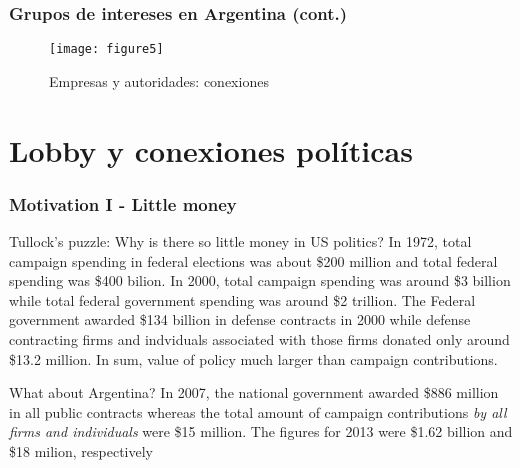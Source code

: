 \documentclass[handout,final,xcolor=dvipsnames]{beamer}
\begin{document}
\begin{frame}\frametitle{Grupos de intereses en Argentina (cont.)}
\begin{figure}[htbp] \vspace{-0.25cm}
  \centering
  \texttt{[image: figure5]} \vspace{0cm}
  \caption{Empresas y autoridades: conexiones}
  \label{fig:3}
\end{figure}
\end{frame}


\section{Lobby y conexiones políticas}

 \begin{frame}\frametitle{Motivation I - Little money}
    \begin{itemize}\itemsep 10pt
      \begin{block}{Tullock's puzzle: Why is there so little money in
          US politics?}
In 1972, total campaign spending in federal elections was
about \$200 million and total federal spending was \$400 bilion. In
2000, total campaign spending was around \$3 billion while total
federal government spending was around \$2 trillion.  The Federal government awarded \$134 billion in defense
contracts in 2000 while defense contracting firms and indviduals associated with
those firms donated only around \$13.2 million. In sum, value
of policy much larger than campaign contributions. 
\end{block}
\begin{block}{What about Argentina?}
In 2007, the national government awarded \$886 million in all public
contracts whereas the total amount of campaign contributions
\textit{by all firms and individuals} were
\$15 million. The figures for 2013 were \$1.62 billion and \$18 milion, respectively
  \end{block}
    \end{itemize}
  \end{frame}
\end{document}
